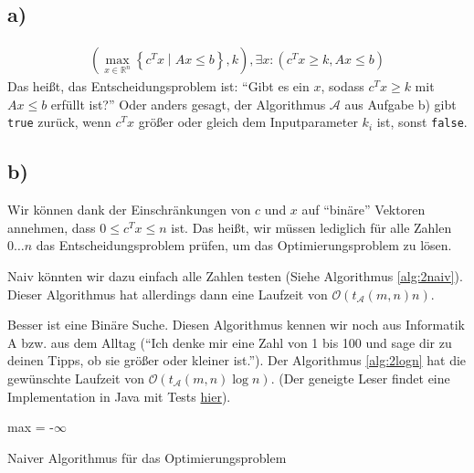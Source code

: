 \documentclass{article}
\begin{document}
\subsection*{a)}
\begin{align*}
\left(\max\limits_{x\in\mathbb{R}^n}\left\{c^Tx\middle|Ax\leq b\right\}, k\right), \exists x: \left(c^Tx\geq k, Ax \leq b\right)
\end{align*}
Das heißt, das Entscheidungsproblem ist: "`Gibt es ein $x$, sodass $c^Tx \geq k$ mit $Ax \leq b$ erfüllt ist?"'
Oder anders gesagt, der Algorithmus $\mathcal{A}$ aus Aufgabe b) gibt \texttt{true} zurück, wenn $c^Tx$ größer oder gleich dem Inputparameter $k_i$ ist, sonst \texttt{false}.

\subsection*{b)}
Wir können dank der Einschränkungen von $c$ und $x$ auf "`binäre"' Vektoren annehmen, dass $0 \leq c^Tx \leq n$ ist.
Das heißt, wir müssen lediglich für alle Zahlen $0\dots n$ das Entscheidungsproblem prüfen, um das Optimierungsproblem zu lösen. 

Naiv könnten wir dazu einfach alle Zahlen testen (Siehe Algorithmus \ref{alg:2naiv}). Dieser Algorithmus hat allerdings dann eine Laufzeit von $\mathcal{O}\left(t_\mathcal{A}\left(m,n\right)n\right)$.

Besser ist eine Binäre Suche. Diesen Algorithmus kennen wir noch aus Informatik A bzw. aus dem Alltag ("`Ich denke mir eine Zahl von 1 bis 100 und sage dir zu deinen Tipps, ob sie größer oder kleiner ist."'). Der Algorithmus \ref{alg:2logn} hat die gewünschte Laufzeit von $\mathcal{O}\left(t_\mathcal{A}\left(m,n\right)\log{n}\right)$. (Der geneigte Leser findet eine Implementation in Java mit Tests \href{http://uni.sebastian-hoeffner.de/DInf/DInf14102b.java}{hier}).

\begin{algorithm}
\DontPrintSemicolon
max = -$\infty$\;
\;
\label{alg:2naiv}
\caption{Naiver Algorithmus für das Optimierungsproblem}
\end{algorithm}
\end{document}
